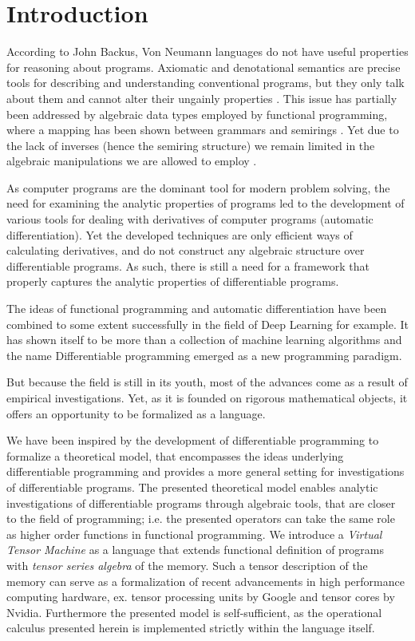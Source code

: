 \section{Introduction}

According to John Backus, Von Neumann languages do not have useful properties for reasoning about programs. Axiomatic and denotational semantics are precise tools for describing and understanding conventional programs, but they only talk about them and cannot alter their ungainly
properties \cite{backus}. This issue has partially been addressed by algebraic data types employed by functional programming, where a mapping has been shown between grammars and semirings \cite{7Trees}.
Yet due to the lack of inverses (hence the semiring structure) we remain limited in the algebraic manipulations we are allowed to employ \cite{complexCat}.

As computer programs are the dominant tool for modern problem solving, the need for examining the analytic properties of programs led to the development of various tools for dealing with derivatives of computer programs (automatic differentiation). Yet the developed techniques are only efficient ways of calculating derivatives, and do not construct any algebraic structure over differentiable programs. As such, there is still a need for a framework that properly captures the analytic properties of differentiable programs. 

The ideas of functional programming and automatic differentiation have been combined to some extent successfully in the field of Deep Learning for example. %
It has shown itself to be more than a collection of machine learning algorithms and the name Differentiable programming emerged as a new programming paradigm. 



But because the field is still in its youth, most of the advances come as a result of empirical investigations.%
Yet, as it is founded on rigorous mathematical objects, it offers an opportunity to be formalized as a language.

We have been inspired by the development of differentiable programming to formalize a theoretical model, that encompasses the ideas underlying differentiable programming and provides a more general setting for investigations of differentiable programs. The presented theoretical model enables analytic investigations of differentiable programs through algebraic tools, that are closer to the field of programming; i.e. the presented operators can take the same role as higher order functions in functional programming. We introduce a \emph{Virtual Tensor Machine} as a language that extends functional definition of programs with \emph{tensor series algebra} of the memory. Such a tensor description of the memory can serve as a formalization of recent advancements in high performance computing hardware, ex. tensor processing units by Google and tensor cores by Nvidia. Furthermore the presented model is self-sufficient, as the operational calculus presented herein is implemented strictly within the language itself.


